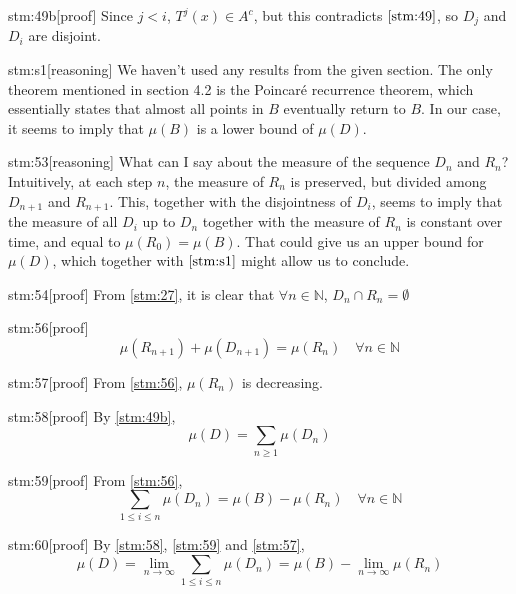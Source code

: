 \begin{stm}{stm:49b}[proof]
Since $j < i$, $T^j(x) \in A^c$, but this contradicts $\ref{stm:49}$, so $D_j$ and $D_i$ are disjoint.
\end{stm}

\begin{stm}{stm:s1}[reasoning]
We haven't used any results from the given section. The only theorem mentioned in section 4.2 is the Poincaré recurrence theorem, which essentially states that almost all points in $B$ eventually return to $B$. In our case, it seems to imply that $\mu(B)$ is a lower bound of $\mu(D)$. 
\end{stm}

\begin{stm}{stm:53}[reasoning]
What can I say about the measure of the sequence $D_n$ and $R_n$? Intuitively, at each step $n$, the measure of $R_n$ is preserved, but divided among $D_{n+1}$ and $R_{n+1}$. This, together with the disjointness of $D_i$, seems to imply that the measure of all $D_i$ up to $D_n$ together with the measure of $R_n$ is constant over time, and equal to $\mu(R_0) = \mu(B)$. That could give us an upper bound for $\mu(D)$, which together with $\ref{stm:s1}$ might allow us to conclude.
\end{stm}

\begin{stm}{stm:54}[proof]
From \ref{stm:27}, it is clear that $\forall n \in \mathbb{N}$, $D_n \cap R_n = \emptyset$
\end{stm}

\begin{stm}{stm:56}[proof]
\[
\mu(R_{n+1}) + \mu(D_{n+1}) = \mu(R_n) \quad \forall n \in \mathbb{N}
\]
\end{stm}

\begin{stm}{stm:57}[proof]
From \ref{stm:56}, $\mu(R_n)$ is decreasing.
\end{stm}

\begin{stm}{stm:58}[proof]
By \ref{stm:49b}, 
\[
\mu(D) = \sum_{n \ge 1} \mu(D_n)
\]
\end{stm}

\begin{stm}{stm:59}[proof]
From \ref{stm:56},
\[
\sum_{1 \le i \le n} \mu(D_n) = \mu(B) - \mu(R_n) \quad \forall n \in \mathbb{N}
\]
\end{stm}

\begin{stm}{stm:60}[proof]
By \ref{stm:58}, \ref{stm:59} and \ref{stm:57},
\[
\mu(D) = \lim_{n \to \infty} \sum_{1 \le i \le n} \mu(D_n) = \mu(B) - \lim_{n \to \infty} \mu(R_n)
\]
\end{stm}

